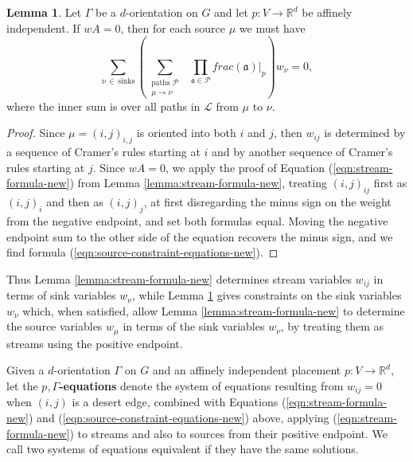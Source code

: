 \documentclass[11pt,letterpaper]{amsart}
\theoremstyle{definition}
\newtheorem{lemma}{Lemma}
\begin{document}
\begin{lemma}\label{lemma:source-constraint-equations-new}
    Let $\Gamma$ be a $d$-orientation on $G$ and let $p:V \to \mathbb{R}^d$ be affinely independent. If $wA = 0$, then for each source $\mu$ we must have
    \begin{equation}\label{eqn:source-constraint-equations-new}
        \sum_{\nu \, \in \, \text{sinks}} \left( \sum_{\substack{\text{paths } \mathcal{P} \\ \mu \to \nu}} \,\,\, \prod_{\mathfrak{a} \in \mathcal{P}} frac(\mathfrak{a})|_p \right) w_\nu = 0,
    \end{equation}
    where the inner sum is over all paths in $\mathcal{L}$ from $\mu$ to $\nu$.
\end{lemma}

\begin{proof}
    Since $\mu=(i,j)_{i,j}$ is oriented into both $i$ and $j$, then $w_{ij}$ is determined by a sequence of Cramer's rules starting at $i$ and by another sequence of Cramer's rules starting at $j$. Since $wA=0$, we apply the proof of Equation (\ref{eqn:stream-formula-new}) from Lemma \ref{lemma:stream-formula-new}, treating $(i,j)_{ij}$ first as $(i,j)_i$ and then as $(i,j)_j$, at first disregarding the minus sign on the weight from the negative endpoint, and set both formulas equal. Moving the negative endpoint sum to the other side of the equation recovers the minus sign, and we find formula (\ref{eqn:source-constraint-equations-new}).
\end{proof}

Thus Lemma \ref{lemma:stream-formula-new} determines stream variables $w_{ij}$ in terms of sink variables $w_\nu$, while Lemma \ref{lemma:source-constraint-equations-new} gives constraints on the sink variables $w_\nu$ which, when satisfied, allow Lemma \ref{lemma:stream-formula-new} to determine the source variables $w_\mu$ in terms of the sink variables $w_\nu$, by treating them as streams using the positive endpoint.

Given a $d$-orientation $\Gamma$ on $G$ and an affinely independent placement $p:V \to \mathbb{R}^d$, let the \textbf{$p,\Gamma$-equations} denote the system of equations resulting from $w_{ij} = 0$ when $(i,j)$ is a desert edge, combined with Equations (\ref{eqn:stream-formula-new}) and (\ref{eqn:source-constraint-equations-new}) above, applying (\ref{eqn:stream-formula-new}) to streams and also to sources from their positive endpoint. We call two systems of equations equivalent if they have the same solutions.
\end{document}
